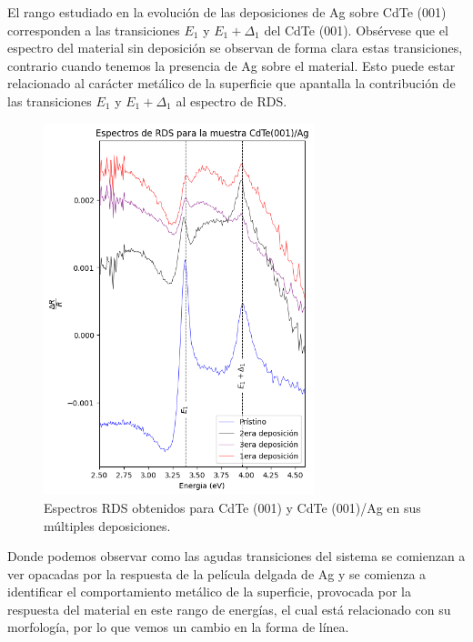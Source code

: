 El rango estudiado en la evolución de las deposiciones de Ag sobre CdTe (001) corresponden a las transiciones $E_{1}$ y $E_{1}+\Delta_{1}$ del CdTe (001)\cite{Camacho2005}. Obsérvese que el espectro del material sin deposición se observan de forma clara estas transiciones, contrario cuando tenemos la presencia de Ag sobre el material. Esto puede estar relacionado al carácter metálico de la superficie que apantalla la contribución de las transiciones $E_{1}$ y $E_{1}+\Delta_{1}$ al espectro de RDS.

\begin{figure}[H]
    \centering
    \includegraphics[width=0.7\textwidth]{figures/chap4/cdte-ag/rds-results/output-rds3.png}
        \caption{Espectros RDS obtenidos para CdTe (001) y CdTe (001)/Ag en sus múltiples deposiciones.}
    \label{fig:cdte-rds-1}
\end{figure}

Donde podemos observar como las agudas transiciones del sistema se comienzan a ver opacadas por la respuesta de la película delgada de Ag y se comienza a identificar el comportamiento metálico de la superficie, provocada por la respuesta del material en este rango de energías, el cual está relacionado con su morfología, por lo que vemos un cambio en la forma de línea.

